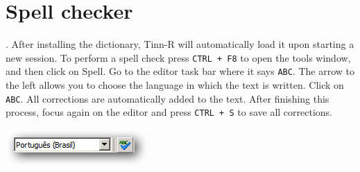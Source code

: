 
\section{Spell checker}

\textit{}.
After installing the dictionary, Tinn-R will automatically load it upon starting a new session.
To perform a spell check press \texttt{CTRL + F8} to open the tools window, and then click on Spell.
Go to the editor task bar where it says \texttt{ABC}.
The arrow to the left allows you to choose the language in which the text is written.
Click on \texttt{ABC}. All corrections are automatically added to the text. After finishing this process,
focus again on the editor and press \texttt{CTRL + S} to save all corrections.

\includegraphics[scale=0.50]{./res/secrets_spell.png}
